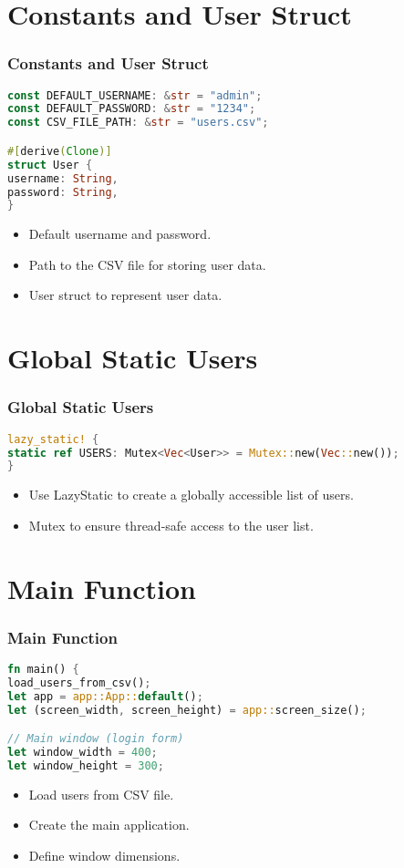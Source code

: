 \documentclass[aspectratio=169, table]{beamer}
\begin{document}
\section{Constants and User Struct}
\begin{frame}[fragile]
\frametitle{Constants and User Struct}
\begin{lstlisting}[language=Rust]
const DEFAULT_USERNAME: &str = "admin";
const DEFAULT_PASSWORD: &str = "1234";
const CSV_FILE_PATH: &str = "users.csv";

#[derive(Clone)]
struct User {
username: String,
password: String,
}
\end{lstlisting}
\begin{itemize}
\item Default username and password.
\item Path to the CSV file for storing user data.
\item User struct to represent user data.
\end{itemize}
\end{frame}

\section{Global Static Users}
\begin{frame}[fragile]
\frametitle{Global Static Users}
\begin{lstlisting}[language=Rust]
lazy_static! {
static ref USERS: Mutex<Vec<User>> = Mutex::new(Vec::new());
}
\end{lstlisting}
\begin{itemize}
\item Use LazyStatic to create a globally accessible list of users.
\item Mutex to ensure thread-safe access to the user list.
\end{itemize}
\end{frame}

\section{Main Function}
\begin{frame}[fragile]
\frametitle{Main Function}
\begin{lstlisting}[language=Rust]
fn main() {
load_users_from_csv();
let app = app::App::default();
let (screen_width, screen_height) = app::screen_size();

// Main window (login form)
let window_width = 400;
let window_height = 300;
\end{lstlisting}
\begin{itemize}
\item Load users from CSV file.
\item Create the main application.
\item Define window dimensions.
\end{itemize}
\end{frame}
\end{document}
